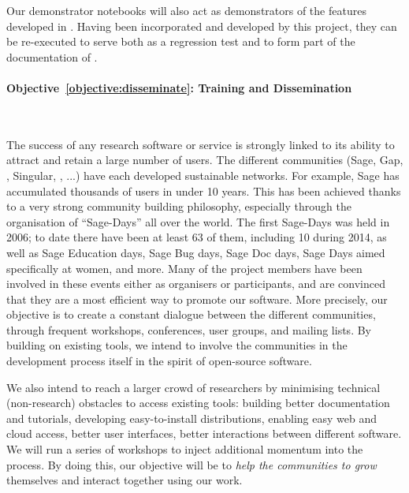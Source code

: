 \documentclass[noworkareas,deliverables,\classoptions]{euproposal}       %
\begin{document}
\begin{proposal}
Our demonstrator notebooks will also act as demonstrators of the
features developed in \TheProject. Having been incorporated and
developed by this project, they can be re-executed to serve both as a
regression test and to form part of the documentation of \TheProject.



\paragraph{Objective~\ref{objective:disseminate}: Training and Dissemination}\

The success of any research software or service is strongly linked to
its ability to attract and retain a large number of users. The
different communities (Sage, Gap, \PariGP, Singular, \Jupyter, ...)
have each developed sustainable networks. For example, Sage has
accumulated thousands of users in under 10 years. This has been
achieved thanks to a very strong community building philosophy,
especially through the organisation of ``Sage-Days'' all over the
world. The first Sage-Days was held in 2006; to date there have been
at least 63 of them, including 10 during 2014, as well as Sage
Education days, Sage Bug days, Sage Doc days, Sage Days aimed
specifically at women, and more. Many of the \TheProject{} project
members have been involved in these events either as organisers or
participants, and are convinced that they are a most efficient way to
promote our software. More precisely, our objective is to create a
constant dialogue between the different communities, through frequent
workshops, conferences, user groups, and mailing lists. By building on
existing tools, we intend to involve the communities in the
development process itself in the spirit of open-source software.

We also intend to reach a larger crowd of researchers by minimising
technical (non-research) obstacles to access existing tools: building
better documentation and tutorials, developing easy-to-install
distributions, enabling easy web and cloud access, better user
interfaces, better interactions between different software.  We will
run a series of workshops to inject additional momentum into the
process. By doing this, our objective will be to \emph{help the
  communities to grow} themselves and interact together using our
work.



\end{proposal}
\end{document}
